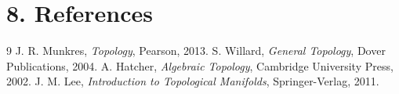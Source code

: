 \section*{8. References}
\begin{thebibliography}{9}
 J. R. Munkres, \emph{Topology}, Pearson, 2013.
 S. Willard, \emph{General Topology}, Dover Publications, 2004.
 A. Hatcher, \emph{Algebraic Topology}, Cambridge University Press, 2002.
 J. M. Lee, \emph{Introduction to Topological Manifolds}, Springer-Verlag, 2011.
\end{thebibliography}
